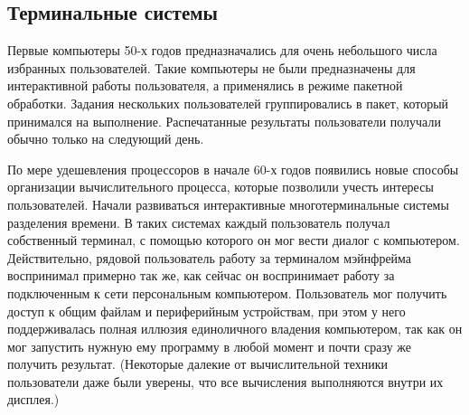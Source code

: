 \subsection{Терминальные системы}
Первые компьютеры 50-х годов предназначались для очень небольшого числа избранных
пользователей. Такие компьютеры не были предназначены для интерактивной работы
пользователя, а применялись в режиме пакетной обработки.  Задания нескольких
пользователей группировались в пакет, который принимался на выполнение. Распечатанные
результаты пользователи получали обычно только на следующий день.

По мере удешевления процессоров в начале 60-х годов появились новые способы организации
вычислительного процесса, которые позволили учесть интересы пользователей.  Начали
развиваться интерактивные многотерминальные системы разделения времени.  В таких
системах каждый пользователь получал собственный терминал, с помощью которого он мог
вести диалог с компьютером.
Действительно, рядовой пользователь работу за терминалом мэйнфрейма воспринимал примерно
так же, как сейчас он воспринимает работу за подключенным к сети персональным
компьютером. Пользователь мог получить доступ к общим файлам и периферийным устройствам,
при этом у него поддерживалась полная иллюзия единоличного владения компьютером, так как
он мог запустить нужную ему программу в любой момент и почти сразу же получить
результат. (Некоторые далекие от вычислительной техники пользователи даже были уверены,
что все вычисления выполняются внутри их дисплея.) \cite{olifer}
